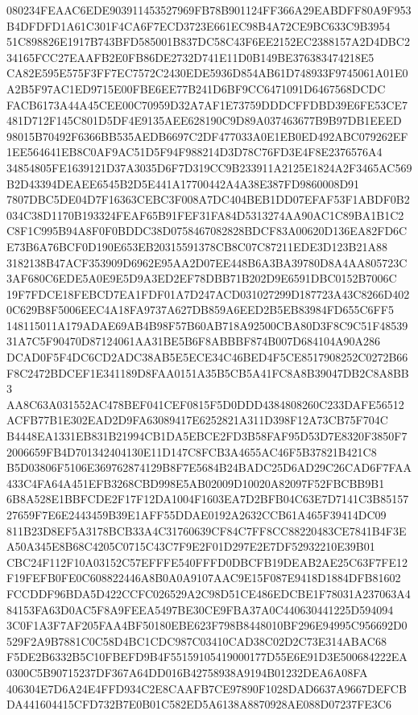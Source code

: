 \documentclass[UTF8,fontset=fandol,zihao=-4,a4paper]{ctexart}
\begin{document}
{{080234FEAAC6EDE903911453527969FB78B901124FF366A29EABDFF80A9F953B4DFDFD1A61C301F4CA6F7ECD3723E661EC98B4A72CE9BC633C9B3954
51C898826E1917B743BFD585001B837DC58C43F6EE2152EC2388157A2D4DBC234165FCC27EAAFB2E0FB86DE2732D741E11D0B149BE376383474218E5
CA82E595E575F3FF7EC7572C2430EDE5936D854AB61D748933F9745061A01E0A2B5F97AC1ED9715E00FBE6EE77B241D6BF9CC6471091D6467568DCDC
FACB6173A44A45CEE00C70959D32A7AF1E73759DDDCFFDBD39E6FE53CE7481D712F145C801D5DF4E9135AEE628190C9D89A037463677B9B97DB1EEED
98015B70492F6366BB535AEDB6697C2DF477033A0E1EB0ED492ABC079262EF1EE564641EB8C0AF9AC51D5F94F988214D3D78C76FD3E4F8E2376576A4
34854805FE1639121D37A3035D6F7D319CC9B233911A2125E1824A2F3465AC569B2D43394DEAEE6545B2D5E441A17700442A4A38E387FD9860008D91
7807DBC5DE04D7F16363CEBC3F008A7DC404BEB1DD07EFAF53F1ABDF0B2034C38D1170B193324FEAF65B91FEF31FA84D5313274AA90AC1C89BA1B1C2
C8F1C995B94A8F0F0BDDC38D0758467082828BDCF83A00620D136EA82FD6CE73B6A76BCF0D190E653EB20315591378CB8C07C87211EDE3D123B21A88
3182138B47ACF353909D6962E95AA2D07EE448B6A3BA39780D8A4AA805723C3AF680C6EDE5A0E9E5D9A3ED2EF78DBB71B202D9E6591DBC0152B7006C
19F7FDCE18FEBCD7EA1FDF01A7D247ACD031027299D187723A43C8266D4020C629B8F5006EEC4A18FA9737A627DB859A6EED2B5EB83984FD655C6FF5
148115011A179ADAE69AB4B98F57B60AB718A92500CBA80D3F8C9C51F4853931A7C5F90470D87124061AA31BE5B6F8ABBBF874B007D684104A90A286
DCAD0F5F4DC6CD2ADC38AB5E5ECE34C46BED4F5CE8517908252C0272B66F8C2472BDCEF1E341189D8FAA0151A35B5CB5A41FC8A8B39047DB2C8A8BB3
AA8C63A031552AC478BEF041CEF0815F5D0DDD4384808260C233DAFE56512ACFB77B1E302EAD2D9FA63089417E6252821A311D398F12A73CB75F704C
B4448EA1331EB831B21994CB1DA5EBCE2FD3B58FAF95D53D7E8320F3850F72006659FB4D701342404130E11D147C8FCB3A4655AC46F5B37821B421C8
B5D03806F5106E369762874129B8F7E5684B24BADC25D6AD29C26CAD6F7FAA433C4FA64A451EFB3268CBD998E5AB02009D10020A82097F52FBCBB9B1
6B8A528E1BBFCDE2F17F12DA1004F1603EA7D2BFB04C63E7D7141C3B8515727659F7E6E2443459B39E1AFF55DDAE0192A2632CCB61A465F39414DC09
811B23D8EF5A3178BCB33A4C31760639CF84C7FF8CC88220483CE7841B4F3EA50A345E8B68C4205C0715C43C7F9E2F01D297E2E7DF52932210E39B01
CBC24F112F10A03152C57EFFFE540FFFD0DBCFB19DEAB2AE25C63F7FE12F19FEFB0FE0C608822446A8B0A0A9107AAC9E15F087E9418D1884DFB81602
FCCDDF96BDA5D422CCFC026529A2C98D51CE486EDCBE1F78031A237063A484153FA63D0AC5F8A9FEEA5497BE30CE9FBA37A0C440630441225D594094
3C0F1A3F7AF205FAA4BF50180EBE623F798B8448010BF296E94995C956692D0529F2A9B7881C0C58D4BC1CDC987C03410CAD38C02D2C73E314ABAC68
F5DE2B6332B5C10FBEFD9B4F55159105419000177D55E6E91D3E500684222EA0300C5B90715237DF367A64DD016B42758938A9194B01232DEA6A08FA
406304E7D6A24E4FFD934C2E8CAAFB7CE97890F1028DAD6637A9667DEFCBDA441604415CFD732B7E0B01C582ED5A6138A8870928AE088D07237FE3C6
}}
\end{document}
